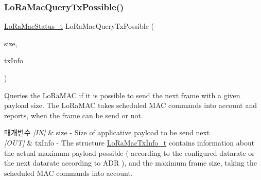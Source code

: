 \mbox{\label{group___l_o_r_a_m_a_c_ga8b0aeaf75f9404ce01da9b202252c231}} 
\subsubsection{\texorpdfstring{Lo\+Ra\+Mac\+Query\+Tx\+Possible()}{LoRaMacQueryTxPossible()}}
{\footnotesize\ttfamily \mbox{\hyperlink{group___l_o_r_a_m_a_c_ga30bd25657e10480f8605ee951b0ecfbd}{Lo\+Ra\+Mac\+Status\+\_\+t}} Lo\+Ra\+Mac\+Query\+Tx\+Possible (\begin{DoxyParamCaption}\item[{uint8\+\_\+t}]{size,  }\item[{\mbox{\hyperlink{group___l_o_r_a_m_a_c_ga3219fea2f3c3355f80d2ed29db613683}{Lo\+Ra\+Mac\+Tx\+Info\+\_\+t}} $\ast$}]{tx\+Info }\end{DoxyParamCaption})}



Queries the Lo\+Ra\+M\+AC if it is possible to send the next frame with a given payload size. The Lo\+Ra\+M\+AC takes scheduled M\+AC commands into account and reports, when the frame can be send or not. 


\begin{DoxyParams}{매개변수}
{\em \mbox{[}\+I\+N\mbox{]}} & size -\/ Size of applicative payload to be send next\\
\hline
{\em \mbox{[}\+O\+U\+T\mbox{]}} & tx\+Info -\/ The structure \mbox{\hyperlink{group___l_o_r_a_m_a_c_ga3219fea2f3c3355f80d2ed29db613683}{Lo\+Ra\+Mac\+Tx\+Info\+\_\+t}} contains information about the actual maximum payload possible ( according to the configured datarate or the next datarate according to A\+DR ), and the maximum frame size, taking the scheduled M\+AC commands into account.\\
\hline
\end{DoxyParams}


